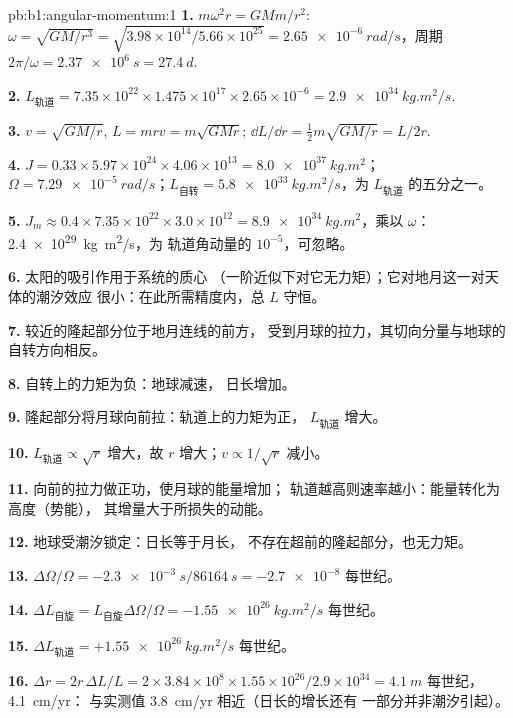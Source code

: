 \begin{solution}{pb:b1:angular-momentum:1}
\textbf{1.} $m\omega^2r = GMm/r^2$: $\omega = \sqrt{GM/r^3} = \sqrt{3.98\times
10^{14}/5.66\times10^{25}} = \qty{2.65e-6}{rad/s}$，周期 $2\pi/\omega =
\qty{2.37e6}{s} = \qty{27.4}{d}$.

\textbf{2.} $L_{\text{轨道}} = 7.35\times10^{22} \times 1.475\times10^{17}
\times 2.65\times10^{-6} = \qty{2.9e34}{kg.m^2/s}$.

\textbf{3.} $v = \sqrt{GM/r}$, $L = mrv = m\sqrt{GMr}$; $\dd L/\dd r =
\tfrac12 m\sqrt{GM/r} = L/2r$.

\textbf{4.} $J = 0.33 \times 5.97\times10^{24} \times 4.06\times10^{13} =
\qty{8.0e37}{kg.m^2}$；$\Omega = \qty{7.29e-5}{rad/s}$；$L_{\text{自转}} =
\qty{5.8e33}{kg.m^2/s}$，为 $L_{\text{轨道}}$ 的五分之一。

\textbf{5.} $J_m \approx 0.4 \times 7.35\times10^{22} \times 3.0\times10^{12} =
\qty{8.9e34}{kg.m^2}$，乘以 $\omega$：\qty{2.4e29}{kg.m^2/s}，为
轨道角动量的 $10^{-5}$，可忽略。

\textbf{6.} 太阳的吸引作用于系统的质心
（一阶近似下对它无力矩）；它对地月这一对天体的潮汐效应
很小：在此所需精度内，总 $L$ 守恒。

\textbf{7.} 较近的隆起部分位于地月连线的前方，
受到月球的拉力，其切向分量与地球的
自转方向相反。

\textbf{8.} 自转上的力矩为负：地球减速，
日长增加。

\textbf{9.} 隆起部分将月球向前拉：轨道上的力矩为正，
$L_{\text{轨道}}$ 增大。

\textbf{10.} $L_{\text{轨道}} \propto \sqrt r$ 增大，故 $r$ 增大；$v \propto
1/\sqrt r$ 减小。

\textbf{11.} 向前的拉力做正功，使月球的能量增加；
轨道越高则速率越小：能量转化为高度（势能），
其增量大于所损失的动能。

\textbf{12.} 地球受潮汐锁定：日长等于月长，
不存在超前的隆起部分，也无力矩。

\textbf{13.} $\Delta\Omega/\Omega = -\qty{2.3e-3}{s}/\qty{86164}{s} =
\num{-2.7e-8}$ 每世纪。

\textbf{14.} $\Delta L_{\text{自旋}} = L_{\text{自旋}}\Delta\Omega/\Omega =
\qty{-1.55e26}{kg.m^2/s}$ 每世纪。

\textbf{15.} $\Delta L_{\text{轨道}} = +\qty{1.55e26}{kg.m^2/s}$ 每世纪。

\textbf{16.} $\Delta r = 2r\,\Delta L/L = 2 \times 3.84\times10^8 \times 1.55
\times10^{26}/2.9\times10^{34} = \qty{4.1}{m}$ 每世纪，\qty{4.1}{cm/yr}：
与实测值 \qty{3.8}{cm/yr} 相近（日长的增长还有
一部分并非潮汐引起）。


\end{solution}
